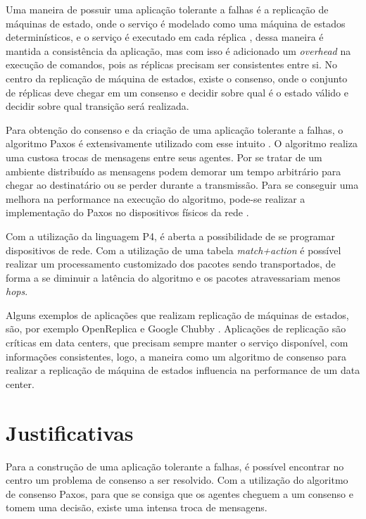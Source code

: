 \documentclass[12pt,
openright, 
oneside,
a4paper,
brazil]{facom-ufu-abntex2}
\theoremstyle{definition}
\begin{document}
Uma maneira de possuir uma aplicação tolerante a falhas é a replicação de máquinas
de estado, onde o serviço é modelado como uma máquina de estados determinísticos, e o
serviço é executado em cada réplica \citep{santos2012state}, dessa maneira é mantida
a consistência da aplicação, mas com isso é adicionado um \textit{overhead} na execução
de comandos, pois as réplicas precisam ser consistentes entre si. No centro da replicação
de máquina de estados, existe o consenso, onde o conjunto de réplicas deve chegar 
em um consenso e decidir sobre qual é o estado válido e decidir sobre qual 
transição será realizada. 

Para obtenção do consenso e da criação de uma aplicação tolerante a falhas, o algoritmo
Paxos é extensivamente utilizado com esse intuito \citep{dang2016paxos}. 
O algoritmo realiza uma custosa trocas de mensagens entre seus agentes. Por se 
tratar de um ambiente distribuído as mensagens podem demorar um tempo arbitrário 
para chegar ao destinatário ou se perder durante a transmissão. Para se 
conseguir uma melhora na performance na execução do algoritmo, pode-se realizar a 
implementação do Paxos no dispositivos físicos da rede \citep{dang2016paxos}.

Com a utilização da linguagem P4, é aberta a possibilidade de se programar dispositivos
de rede. Com a utilização de uma tabela \textit{match+action} é possível 
realizar um processamento customizado dos pacotes sendo transportados, de forma a
se diminuir a latência do algoritmo e os pacotes atravessariam menos \textit{hops}.

Alguns exemplos de aplicações que realizam replicação de máquinas de estados, são,
por exemplo OpenReplica \citep{openreplica} e Google Chubby \citep{27897}. Aplicações
de replicação são críticas em data centers, que precisam sempre manter o serviço 
disponível, com informações consistentes, logo, a maneira como um algoritmo de consenso
para realizar a replicação de máquina de estados influencia na performance de um data center.

\section{Justificativas}
Para a construção de uma aplicação tolerante a falhas, é possível encontrar no centro um
problema de consenso a ser resolvido. Com a utilização do algoritmo de consenso Paxos,
para  que se consiga que os agentes cheguem a um consenso e tomem uma decisão, 
existe uma intensa troca de mensagens.
\end{document}
